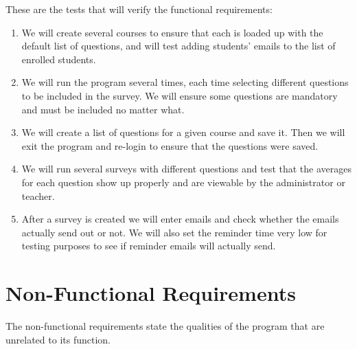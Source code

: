 \documentclass{article}
\begin{document}
These are the tests that will verify the functional requirements:

\begin{enumerate}
  \item We will create several courses to ensure that each is loaded up with the default list of questions, and will test adding students' emails to the list of enrolled students.
  \item We will run the program several times, each time selecting different questions to be included in the survey. We will ensure some questions are mandatory and must be included no matter what.
  \item We will create a list of questions for a given course and save it. Then we will exit the program and re-login to ensure that the questions were saved.
  \item We will run several surveys with different questions and test that the averages for each question show up properly and are viewable by the administrator or teacher.
  \item After a survey is created we will enter emails and check whether the emails actually send out or not. We will also set the reminder time very low for testing purposes to see if reminder emails will actually send.
\end{enumerate}

\section{Non-Functional Requirements}

The non-functional requirements state the qualities of the program that are unrelated to its function.
\end{document}
